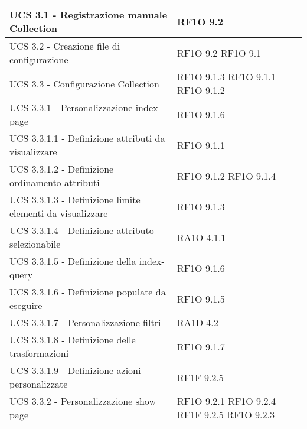 \begin{center}
\begin{longtable}{ | p{5cm} | p{5cm} |}
            UCS 3.1  - Registrazione manuale Collection &  RF1O 9.2 \newline  \\ \hline      
            UCS 3.2  - Creazione file di configurazione &  RF1O 9.2 \newline  RF1O 9.1 \newline  \\ \hline      
            UCS 3.3  - Configurazione Collection &  RF1O 9.1.3 \newline  RF1O 9.1.1 \newline  RF1O 9.1.2 \newline  \\ \hline      
            UCS 3.3.1 - Personalizzazione index page &  RF1O 9.1.6 \newline  \\ \hline      
            UCS 3.3.1.1  - Definizione attributi da visualizzare &  RF1O 9.1.1 \newline  \\ \hline      
            UCS 3.3.1.2  -  Definizione ordinamento attributi &  RF1O 9.1.2 \newline  RF1O 9.1.4 \newline  \\ \hline      
            UCS 3.3.1.3  - Definizione limite elementi da visualizzare &  RF1O 9.1.3 \newline  \\ \hline      
            UCS 3.3.1.4 - Definizione attributo selezionabile &  RA1O 4.1.1 \newline  \\ \hline      
            UCS 3.3.1.5 - Definizione della index-query &  RF1O 9.1.6 \newline  \\ \hline      
            UCS 3.3.1.6 - Definizione populate da eseguire &  RF1O 9.1.5 \newline  \\ \hline      
            UCS 3.3.1.7 - Personalizzazione filtri &  RA1D 4.2 \newline  \\ \hline      
            UCS 3.3.1.8 - Definizione delle trasformazioni &  RF1O 9.1.7 \newline  \\ \hline      
            UCS 3.3.1.9 - Definizione azioni personalizzate &  RF1F 9.2.5 \newline  \\ \hline      
            UCS 3.3.2  -  Personalizzazione show page &  RF1O 9.2.1 \newline  RF1O 9.2.4 \newline  RF1F 9.2.5 \newline  RF1O 9.2.3 \newline  \\ \hline      

\end{longtable}
\end{center}
